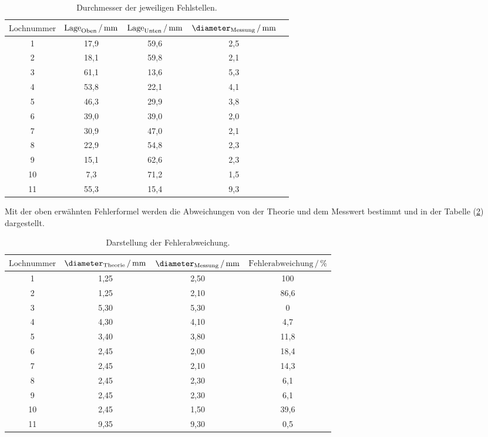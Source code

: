 \begin{table}[H]
  \centering
  \caption{Durchmesser der jeweiligen Fehlstellen.}
  \label{tab:5}
  \begin{tabular}{c c c c c}
    \toprule
     $\text{Lochnummer}$ &
     $\text{Lage}_{\text{Oben}} \,/\, \si[per-mode=fraction]{\milli\meter}$ &
     $\text{Lage}_{\text{Unten}} \,/\, \si[per-mode=fraction]{\milli\meter}$ &
     $\diameter_{\text{Messung}} \,/\, \si[per-mode=fraction]{\milli\meter}$ \\
     \midrule
     1 & 17,9 & 59,6 & 2,5\\
     2 & 18,1 & 59,8 & 2,1\\
     3 & 61,1 & 13,6 & 5,3\\
     4 & 53,8 & 22,1 & 4,1\\
     5 & 46,3 & 29,9 & 3,8\\
     6 & 39,0 & 39,0 & 2,0\\
     7 & 30,9 & 47,0 & 2,1\\
     8 & 22,9 & 54,8 & 2,3\\
     9 & 15,1 & 62,6 & 2,3\\
     10 & 7,3 & 71,2 & 1,5\\
     11 & 55,3& 15,4 & 9,3\\
     \bottomrule
  \end{tabular}
\end{table}
Mit der oben erwähnten Fehlerformel werden die Abweichungen von der Theorie und dem Messwert
bestimmt und in der Tabelle (\ref{tab:6}) dargestellt.
\begin{table}[H]
  \centering
  \caption{Darstellung der Fehlerabweichung.}
  \label{tab:6}
  \begin{tabular}{c c c  c}
    \toprule
     $\text{Lochnummer}$ &
     $\diameter_{\text{Theorie}} \,/\, \si[per-mode=fraction]{\milli\meter}$ &
     $\diameter_{\text{Messung}} \,/\, \si[per-mode=fraction]{\milli\meter}$ &
     $\text{Fehlerabweichung} \,/\, \%$ \\
     \midrule
     1 &  1,25  & 2,50 & 100    \\
     2 &  1,25  & 2,10 & 86,6   \\
     3 &  5,30  & 5,30 & 0      \\
     4 &  4,30  & 4,10 & 4,7    \\
     5 &  3,40  & 3,80 & 11,8   \\
     6 &  2,45  & 2,00 & 18,4   \\
     7 &  2,45  & 2,10 & 14,3   \\
     8 &  2,45  & 2,30 & 6,1    \\
     9 &  2,45  & 2,30 & 6,1    \\
     10 & 2,45 & 1,50 &  39,6   \\
     11 & 9,35 & 9,30 &  0,5    \\
     \bottomrule
  \end{tabular}
\end{table}

